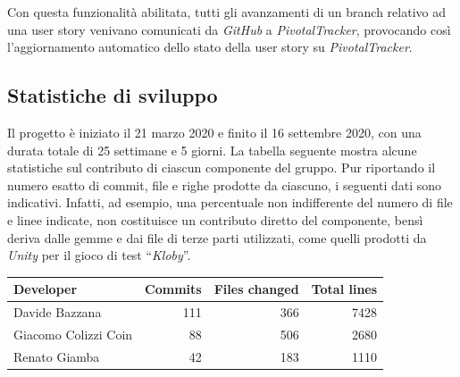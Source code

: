 Con questa funzionalità abilitata, tutti gli avanzamenti di un branch
relativo ad una user story venivano comunicati da \textit{GitHub} a
\textit{PivotalTracker}, provocando così l'aggiornamento automatico
dello stato della user story su \textit{PivotalTracker}.

\subsection{Statistiche di sviluppo}

Il progetto è iniziato il 21 marzo 2020 e finito il 16 settembre
2020, con una durata totale di 25 settimane e 5 giorni.
\newline
\newline
La tabella seguente mostra alcune statistiche sul contributo di
ciascun componente del gruppo. Pur riportando il numero esatto di
commit, file e righe prodotte da ciascuno, i seguenti dati sono
indicativi. Infatti, ad esempio, una percentuale non indifferente del
numero di file e linee indicate, non costituisce un contributo diretto
del componente, bensì deriva dalle gemme e dai file di terze parti
utilizzati, come quelli prodotti da \textit{Unity} per il
gioco di test ``\textit{Kloby}''.

\vspace{1cm}
\begin{tabular}{l|r|r|r}
  \textbf{Developer} & \textbf{Commits} & \textbf{Files changed} & \textbf{Total lines} \\
  \hline
  Davide Bazzana & 111 & 366 & 7428 \\
  \hline
  Giacomo Colizzi Coin & 88 & 506 & 2680 \\
  \hline
  Renato Giamba & 42 & 183 & 1110 \\
  \hline
\end{tabular}
